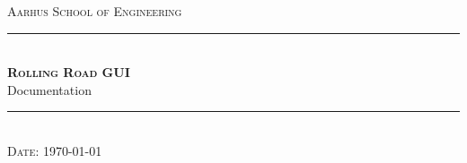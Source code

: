 \newcommand{\HRule}{\rule{\linewidth}{0.1mm}} %

\begin{center}
	
	\textsc{\LARGE Aarhus School of Engineering}\\[1.5cm] %
	
	\HRule \\[0.8cm]
	{\huge \bfseries \textsc{Rolling Road GUI}} \\[0.5cm]{\LARGE Documentation} \\[0.4cm]
	\HRule \\[1.5cm]
	
	
	\textsc{\large Date: \today}\\
	
\end{center} %

\newpage